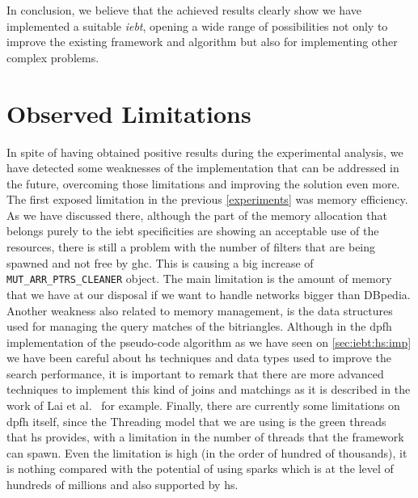 In conclusion, we believe that the achieved results clearly show we have implemented a suitable \emph{\acrlong{iebt}}, opening a wide range of possibilities not only to improve the existing framework and algorithm but also for implementing other complex problems.

\section{Observed Limitations}
In spite of having obtained positive results during the experimental analysis, we have detected some weaknesses of the implementation that can be addressed in the future, 
overcoming those limitations and improving the solution even more.
The first exposed limitation in the previous \autoref{experiments} was memory efficiency. As we have discussed there, although the part of the memory allocation that belongs purely to the \acrshort{iebt} specificities are showing an acceptable use of the resources, there is still a problem with the number of filters that are being spawned and not free by \acrshort{ghc}.
This is causing a big increase of \texttt{MUT\_ARR\_PTRS\_CLEANER} object. The main limitation is the amount of memory that we have at our disposal if we want to handle networks bigger than DBpedia.
Another weakness also related to memory management, is the data structures used for managing the query matches of the bitriangles. Although in the \acrshort{dpfh} implementation of the pseudo-code algorithm as we have seen on \autoref{sec:iebt:hs:imp} we have been careful about \acrshort{hs} techniques and data types used to improve the search performance, it is important to remark that 
there are more advanced techniques to implement this kind of joins and matchings as it is described in the work of Lai et al.~\cite{Lai} for example.
Finally, there are currently some limitations on \acrfull{dpfh} itself, since the Threading model that we are using is the green threads~\cite{sparks} that \acrshort{hs} provides, with a limitation in the number of threads that the framework can spawn. Even the limitation is high (in the order of hundred of thousands), it is nothing compared with the potential of using sparks which is at the level of hundreds of millions and also supported by \acrshort{hs}.

